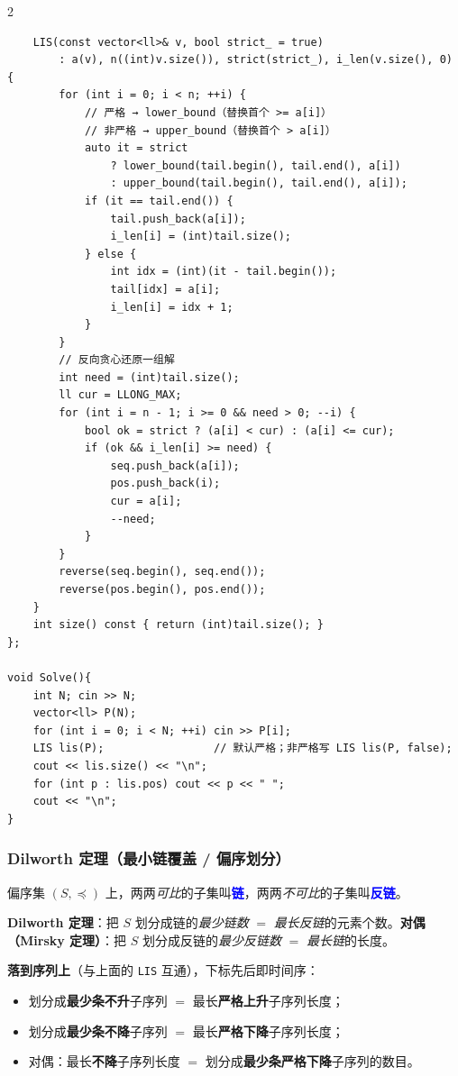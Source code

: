 \begin{multicols*}{2}
\begin{verbatim}
    LIS(const vector<ll>& v, bool strict_ = true)
        : a(v), n((int)v.size()), strict(strict_), i_len(v.size(), 0) {
        for (int i = 0; i < n; ++i) {
            // 严格 → lower_bound（替换首个 >= a[i]）
            // 非严格 → upper_bound（替换首个 > a[i]）
            auto it = strict
                ? lower_bound(tail.begin(), tail.end(), a[i])
                : upper_bound(tail.begin(), tail.end(), a[i]);
            if (it == tail.end()) {
                tail.push_back(a[i]);
                i_len[i] = (int)tail.size();
            } else {
                int idx = (int)(it - tail.begin());
                tail[idx] = a[i];
                i_len[i] = idx + 1;
            }
        }
        // 反向贪心还原一组解
        int need = (int)tail.size();
        ll cur = LLONG_MAX;
        for (int i = n - 1; i >= 0 && need > 0; --i) {
            bool ok = strict ? (a[i] < cur) : (a[i] <= cur);
            if (ok && i_len[i] >= need) {
                seq.push_back(a[i]);
                pos.push_back(i);
                cur = a[i];
                --need;
            }
        }
        reverse(seq.begin(), seq.end());
        reverse(pos.begin(), pos.end());
    }
    int size() const { return (int)tail.size(); }
};

void Solve(){
    int N; cin >> N;
    vector<ll> P(N);
    for (int i = 0; i < N; ++i) cin >> P[i];
    LIS lis(P);                 // 默认严格；非严格写 LIS lis(P, false);
    cout << lis.size() << "\n";
    for (int p : lis.pos) cout << p << " ";
    cout << "\n";
}
		\end{verbatim}

		\subsubsection{Dilworth 定理（最小链覆盖 / 偏序划分）}

		偏序集 $(S,\preceq)$ 上，两两\emph{可比}的子集叫\textcolor{blue}{\textbf{链}}，两两\emph{不可比}的子集叫\textcolor{blue}{\textbf{反链}}。

		\textbf{Dilworth 定理}：把 $S$ 划分成链的\emph{最少链数} $=$ \emph{最长反链}的元素个数。\textbf{对偶（Mirsky 定理）}：把 $S$ 划分成反链的\emph{最少反链数} $=$ \emph{最长链}的长度。

		\textbf{落到序列上}（与上面的 \texttt{LIS} 互通），下标先后即时间序：

		\begin{itemize}
			\item 划分成\textbf{最少条不升}子序列 $=$ 最长\textbf{严格上升}子序列长度；
			\item 划分成\textbf{最少条不降}子序列 $=$ 最长\textbf{严格下降}子序列长度；
			\item 对偶：最长\textbf{不降}子序列长度 $=$ 划分成\textbf{最少条严格下降}子序列的数目。
		\end{itemize}


\end{multicols*}
